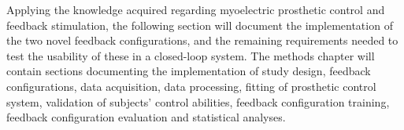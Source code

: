 

Applying the knowledge acquired regarding myoelectric prosthetic control and feedback stimulation, the following section will document the implementation of the two novel feedback configurations, and the remaining requirements needed to test the usability of these in a closed-loop system. The methods chapter will contain sections documenting the implementation of study design, feedback configurations, data acquisition, data processing, fitting of prosthetic control system, validation of subjects' control abilities, feedback configuration training, feedback configuration evaluation and statistical analyses.      